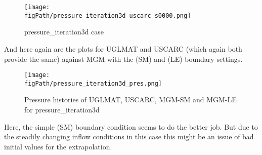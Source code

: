 \begin{figure}[H]
\begin{center}
\texttt{[image: \\figPath/pressure\_iteration3d\_uscarc\_s0000.png]}
\end{center}
\caption{pressure\_iteration3d case}
\label{FIG_MGM_pi}
\end{figure}

And here again are the plots for UGLMAT and USCARC (which again both provide the same) against MGM with the (SM) and (LE) boundary settings.
\begin{figure}[H]
\begin{center}
\texttt{[image: \\figPath/pressure\_iteration3d\_pres.png]}
\end{center}
\caption{Pressure histories of UGLMAT, USCARC, MGM-SM and MGM-LE for pressure\_iteration3d}
\label{FIG_MGM_pi}
\end{figure}

Here, the simple (SM) boundary condition seems to do the better job. But due to the steadily changing inflow conditions in this case this might be an issue of bad initial values for the extrapolation. 



